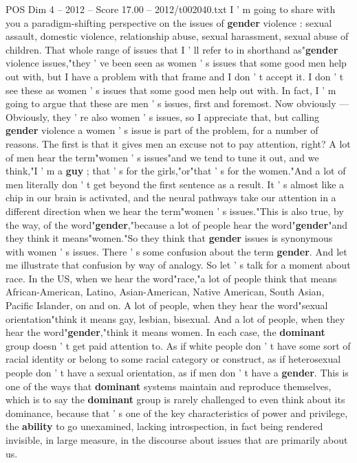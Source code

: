 \begin{textsample}{POS Dim 4 – 2012 – Score 17.00 – 2012/t002040.txt}  \label{ex:f4_pos_071}
I ' m going to share with you a paradigm-shifting perspective on the issues of \textbf{gender} violence : sexual assault, domestic violence, relationship abuse, sexual harassment, sexual abuse of children.
That whole range of issues that I ' ll refer to in shorthand as"\textbf{gender} violence issues,"they ' ve been seen as women ' s issues that some good men help out with, but I have a problem with that frame and I don ' t accept it.
I don ' t see these as women ' s issues that some good men help out with.
In fact, I ' m going to argue that these are men ' s issues, first and foremost.
Now obviously — Obviously, they ' re also women ' s issues, so I appreciate that, but calling \textbf{gender} violence a women ' s issue is part of the problem, for a number of reasons.
The first is that it gives men an excuse not to pay attention, right?
A lot of men hear the term"women ' s issues"and we tend to tune it out, and we think,"I ' m a \textbf{guy} ; that ' s for the girls,"or"that ' s for the women."And a lot of men literally don ' t get beyond the first sentence as a result.
It ' s almost like a chip in our brain is activated, and the neural pathways take our attention in a different direction when we hear the term"women ' s issues."This is also true, by the way, of the word"\textbf{gender},"because a lot of people hear the word"\textbf{gender}"and they think it means"women."So they think that \textbf{gender} issues is synonymous with women ' s issues.
There ' s some confusion about the term \textbf{gender}.
And let me illustrate that confusion by way of analogy.
So let ' s talk for a moment about race.
In the US, when we hear the word"race,"a lot of people think that means African-American, Latino, Asian-American, Native American, South Asian, Pacific Islander, on and on.
A lot of people, when they hear the word"sexual orientation"think it means gay, lesbian, bisexual.
And a lot of people, when they hear the word"\textbf{gender},"think it means women.
In each case, the \textbf{dominant} group doesn ' t get paid attention to.
As if white people don ' t have some sort of racial identity or belong to some racial category or construct, as if heterosexual people don ' t have a sexual orientation, as if men don ' t have a \textbf{gender}.
This is one of the ways that \textbf{dominant} systems maintain and reproduce themselves, which is to say the \textbf{dominant} group is rarely challenged to even think about its dominance, because that ' s one of the key characteristics of power and privilege, the \textbf{ability} to go unexamined, lacking introspection, in fact being rendered invisible, in large measure, in the discourse about issues that are primarily about us.

\end{textsample}
